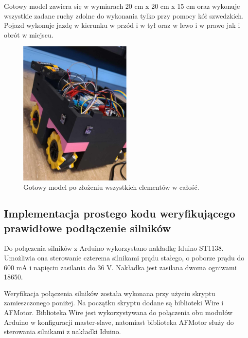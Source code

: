\documentclass{report}
\begin{document}
\newpage

Gotowy model zawiera się w wymiarach 20 cm x 20 cm x 15 cm oraz wykonuje wszystkie zadane ruchy zdolne do wykonania tylko przy pomocy
kół szwedzkich. Pojazd wykonuje jazdę w kierunku w przód i w tył oraz w lewo i w prawo jak i obrót w miejscu.

\begin{figure}[H]
    \centering
    \includegraphics*[width=0.5\textwidth]{"src/Robot_pics/Finished.png"}
    \caption{Gotowy model po złożeniu wszystkich elementów w całość.}
    \label{fig:bt_con_arduino}
\end{figure}



\subsection{\Large Implementacja prostego kodu weryfikującego prawidłowe podłączenie silników}

%
%

Do połączenia silników z Arduino wykorzystano nakładkę Iduino ST1138. Umożliwia ona sterowanie czterema silnikami prądu stałego, o poborze prądu do 600 mA i napięciu zasilania do 36 V. Nakładka jest zasilana dwoma ogniwami 18650.

Weryfikacja połączenia silników została wykonana przy użyciu skryptu zamieszczonego poniżej. Na początku skryptu dodane są biblioteki Wire i AFMotor. Biblioteka Wire jest wykorzystywana do połączenia obu modułów Arduino w konfiguracji master-slave, natomiast biblioteka AFMotor służy do sterowania silnikami z nakładki Iduino.
\end{document}
